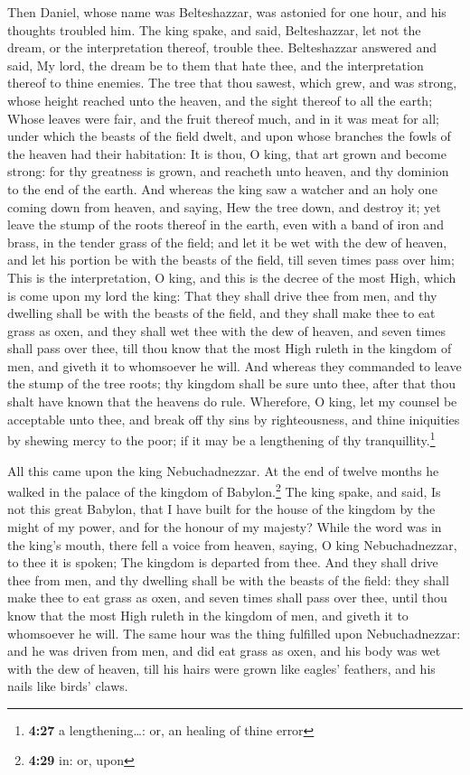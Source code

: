  Then Daniel, whose name was Belteshazzar, was astonied
for one hour, and his thoughts troubled him. The king spake, and said,
Belteshazzar, let not the dream, or the interpretation thereof, trouble
thee. Belteshazzar answered and said, My lord, the dream be to them that
hate thee, and the interpretation thereof to thine enemies.
 The tree that thou sawest, which grew, and was strong,
whose height reached unto the heaven, and the sight thereof to all the
earth;  Whose leaves were fair, and the fruit thereof
much, and in it was meat for all; under which the beasts of the field
dwelt, and upon whose branches the fowls of the heaven had their
habitation:  It is thou, O king, that art grown and
become strong: for thy greatness is grown, and reacheth unto heaven, and
thy dominion to the end of the earth.  And whereas the
king saw a watcher and an holy one coming down from heaven, and saying,
Hew the tree down, and destroy it; yet leave the stump of the roots
thereof in the earth, even with a band of iron and brass, in the tender
grass of the field; and let it be wet with the dew of heaven, and let
his portion be with the beasts of the field, till seven times pass over
him;  This is the interpretation, O king, and this is the
decree of the most High, which is come upon my lord the king:
 That they shall drive thee from men, and thy dwelling
shall be with the beasts of the field, and they shall make thee to eat
grass as oxen, and they shall wet thee with the dew of heaven, and seven
times shall pass over thee, till thou know that the most High ruleth in
the kingdom of men, and giveth it to whomsoever he will. 
And whereas they commanded to leave the stump of the tree roots; thy
kingdom shall be sure unto thee, after that thou shalt have known that
the heavens do rule.  Wherefore, O king, let my counsel
be acceptable unto thee, and break off thy sins by righteousness, and
thine iniquities by shewing mercy to the poor; if it may be a
lengthening of thy tranquillity.\footnote{\textbf{4:27} a
  lengthening\ldots: or, an healing of thine error}

 All this came upon the king Nebuchadnezzar.
 At the end of twelve months he walked in the palace of
the kingdom of Babylon.\footnote{\textbf{4:29} in: or, upon}
 The king spake, and said, Is not this great Babylon,
that I have built for the house of the kingdom by the might of my power,
and for the honour of my majesty?  While the word was in
the king's mouth, there fell a voice from heaven, saying, O king
Nebuchadnezzar, to thee it is spoken; The kingdom is departed from thee.
 And they shall drive thee from men, and thy dwelling
shall be with the beasts of the field: they shall make thee to eat grass
as oxen, and seven times shall pass over thee, until thou know that the
most High ruleth in the kingdom of men, and giveth it to whomsoever he
will.  The same hour was the thing fulfilled upon
Nebuchadnezzar: and he was driven from men, and did eat grass as oxen,
and his body was wet with the dew of heaven, till his hairs were grown
like eagles' feathers, and his nails like birds' claws.

